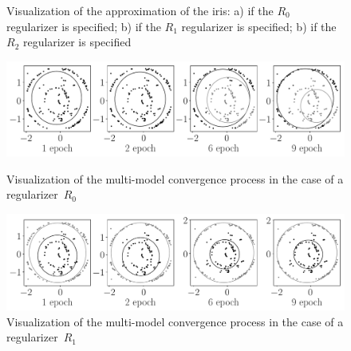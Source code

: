 \begin{figure}[h!]
\caption{Visualization of the approximation of the iris: a) if the $ R_0 $ regularizer is specified; b) if the $ R_1 $ regularizer is specified; b) if the $ R_2 $ regularizer is specified}
\label{ce:fig6}
\end{figure}


\begin{figure}
     \includegraphics[width=\textwidth]{experiment_real_not_prior}\\
     \caption{Visualization of the multi-model convergence process in the case of a regularizer~$R_0$}
    \label{ce:fig7}
\end{figure}

\begin{figure}
     \includegraphics[width=\textwidth]{experiment_real_prior}
     \caption{Visualization of the multi-model convergence process in the case of a regularizer~$R_1$}
    \label{ce:fig8}
\end{figure}

